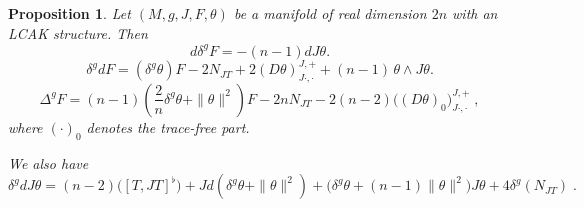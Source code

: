 \documentclass[10pt,a4paper]{amsart}
\newtheorem{prop}{Proposition}
\begin{document}
\begin{prop} \label{coexactform}
Let $(M, g, J, F, \theta)$ be a manifold of real dimension $2n$ with an LCAK structure.
Then
\begin{equation} \label{ddelF}
d \delta^g F = -(n-1) d J \theta.
\end{equation}
\begin{equation} \label{deldF}
\delta^g d  F =  (\delta^g \theta ) F - 2 N_{JT} + 2(D \theta)^{J,+}_{J\cdot,\cdot} + (n-1)\, \theta \wedge J\theta. 
\end{equation}
\begin{equation} \label{DeltaF}
\Delta^g F = (n-1) \left(\frac{2}{n} \delta^g \theta + \| \theta \|^2\right) F - 2n N_{JT}  - 2(n-2) \big( (D \theta)_0 \big)^{J,+}_{J\cdot,\cdot} \; ,
\end{equation}
where $(\cdot)_{0}$ denotes the trace-free part.  

\noindent We also have
\begin{equation} \label{deldJtheta}
\delta^g d J\theta = (n-2) \big( [T, JT]^{\flat} \big)+ J d(\delta^g \theta + \|\theta\|^2) + \big( \delta^g \theta  + (n-1) \|\theta\|^2 \big)J\theta + 4\delta^g (N_{JT})\; .    
\end{equation}
\end{prop}
\end{document}
